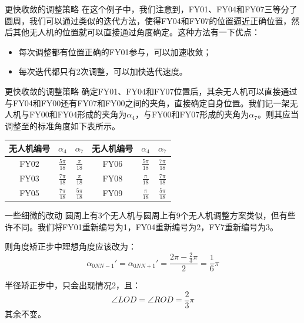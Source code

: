 \documentclass[aspectratio=169]{beamer}
\begin{document}
\begin{frame}{更快收敛的调整策略}
    在这个例子中，我们注意到，FY01、FY04和FY07三等分了圆周，我们可以通过类似的迭代方法，使得FY04和FY07的位置逼近正确位置，然后其他无人机的位置就可以直接通过角度确定。这种方法有一下优点：
    \begin{itemize}
        \item 每次调整都有位置正确的FY01参与，可以加速收敛；
        \item 每次迭代都只有2次调整，可以加快迭代速度。
    \end{itemize}
\end{frame}

\begin{frame}{更快收敛的调整策略}
    确定FY01、FY04和FY07位置后，其余无人机可以直接通过与FY04和FY00还有FY07和FY00之间的夹角，直接确定自身位置。我们记一架无人机与FY00和FY04形成的夹角为$\alpha_4$，与FY00和FY07形成的夹角为$\alpha_7$。则其应当调整至的标准角度如下表所示。
    \begin{table}[!ht]
        \centering
        \begin{tabular}{ccc|ccc}
        \toprule
            无人机编号 & $\alpha_4$ & $\alpha_7$ & 无人机编号 & $\alpha_4$ & $\alpha_7$ \\ 
            \midrule
            FY02 & $\frac{5\pi}{18}$ & $\frac{\pi}{18}$ & FY06 & $\frac{5\pi}{18}$ & $\frac{7\pi}{18}$ \\ 
            FY03 & $\frac{7\pi}{18}$ & $\frac{\pi}{18}$ & FY08 & $\frac{\pi}{18}$ & $\frac{7\pi}{18}$\\ 
            FY05 & $\frac{7\pi}{18}$ & $\frac{5\pi}{18}$ & FY09 & $\frac{\pi}{18}$ & $\frac{5\pi}{18}$ \\ 
        \bottomrule
        \end{tabular}
    \end{table}
\end{frame}

\begin{frame}{一些细微的改动}
    圆周上有3个无人机与圆周上有9个无人机调整方案类似，但有些许不同。我们将FY01重新编号为1，FY04重新编号为2，FY7重新编号为3。

    则角度矫正步中理想角度应该改为：
    \begin{equation}
        \alpha_{0NN-1}' = \alpha_{0NN+1}' = \frac{2\pi - \frac{2}{3}\pi}{2} = \frac{1}{6}\pi
    \end{equation}

    半径矫正步中，只会出现情况2，且：
    \begin{equation}
        \angle LOD = \angle ROD = \frac{2}{3}\pi
    \end{equation}
    其余不变。
\end{frame}
\end{document}

